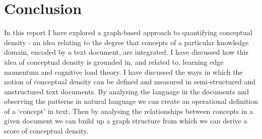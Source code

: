 \documentclass[12pt]{article}
\begin{document}
\section{Conclusion} \label{sec:conclusion}
In this report I have explored a graph-based approach to quantifying conceptual density - an idea relating to the degree that concepts of a particular knowledge domain, encoded by a text document, are integrated. I have discussed how this idea of conceptual density is grounded in, and related to, learning edge momentum and cognitive load theory. I have discussed the ways in which the notion of conceptual density can be defined and measured in semi-structured and unstructured text documents. By analysing the language in the documents and observing the patterns in natural language we can create an operational definition of a `concept' in text. Then by analysing the relationships between concepts in a given document we can build up a graph structure from which we can derive a score of conceptual density. 


% 





    

\end{document}
